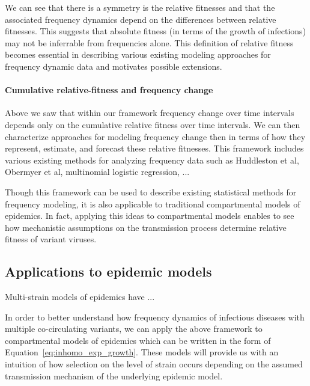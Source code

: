 \documentclass[12pt,oneside,letterpaper]{article}
\begin{document}
We can see that there is a symmetry is the relative fitnesses and that the associated frequency dynamics depend on the differences between relative fitnesses.
This suggests that absolute fitness (in terms of the growth of infections) may not be inferrable from frequencies alone.
This definition of relative fitness becomes essential in describing various existing modeling approaches for frequency dynamic data and motivates possible extensions.

\paragraph{Cumulative relative-fitness and frequency change}

Above we saw that within our framework frequency change over time intervals depends only on the cumulative relative fitness over time intervals.
We can then characterize approaches for modeling frequency change then in terms of how they represent, estimate, and forecast these relative fitnesses.
This framework includes various existing methods for analyzing frequency data such as Huddleston et al, Obermyer et al, multinomial logistic regression, ...  %


Though this framework can be used to describe existing statistical methods for frequency modeling, it is also applicable to traditional compartmental models of epidemics.
In fact, applying this ideas to compartmental models enables to see how mechanistic assumptions on the transmission process determine relative fitness of variant viruses.

\subsection*{Applications to epidemic models}

Multi-strain models of epidemics have ...

In order to better understand how frequency dynamics of infectious diseases with multiple co-circulating variants, we can apply the above framework to compartmental models of epidemics which can be written in the form of Equation~\ref{eq:inhomo_exp_growth}.
These models will provide us with an intuition of how selection on the level of strain occurs depending on the assumed transmission mechanism of the underlying epidemic model.
\end{document}
